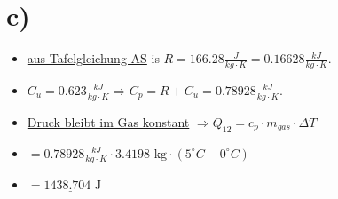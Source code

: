 

\section*{c)}

\begin{itemize}
    \item \underline{aus Tafelgleichung AS} is $R = 166.28 \frac{J}{kg \cdot K} = 0.16628 \frac{kJ}{kg \cdot K}$.
    \item $C_u = 0.623 \frac{kJ}{kg \cdot K} \Rightarrow C_p = R + C_u = 0.78928 \frac{kJ}{kg \cdot K}$.
    \item \underline{Druck bleibt im Gas konstant} $\Rightarrow Q_{12} = c_p \cdot m_{gas} \cdot \Delta T$
    \item $= 0.78928 \frac{kJ}{kg \cdot K} \cdot 3.4198 \text{ kg} \cdot (5^\circ C - 0^\circ C)$
    \item $= 1 \underline{438.704} \text{ J}$
\end{itemize}